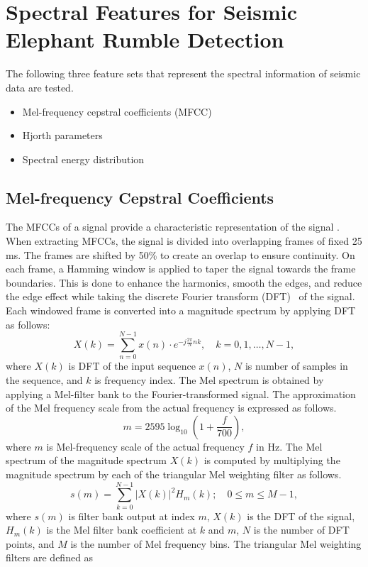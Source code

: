 \documentclass[applsci,article,accept,moreauthors,pdftex]{Definitions/mdpi}
\begin{document}
\section {Spectral Features for Seismic Elephant Rumble Detection}
The following three feature sets that represent the spectral information of seismic data are tested.
\begin{itemize}
	\item Mel-frequency cepstral coefficients (MFCC)
	\item Hjorth parameters
	\item Spectral energy distribution
\end{itemize}
\subsection{Mel-frequency Cepstral Coefficients}
The MFCCs of a signal provide a characteristic representation of the signal \cite{jurafsky}. When extracting MFCCs, the signal is divided into overlapping frames of fixed 25 ms. The frames are shifted by 50\% to create an overlap to ensure continuity. On each frame, a  Hamming window is applied to taper the signal towards the frame boundaries. This is done to enhance the harmonics, smooth the edges, and reduce the edge effect while taking the discrete Fourier transform (DFT)~\cite{oppenheim1999discrete} of the signal. Each windowed frame is converted into a magnitude spectrum by applying DFT as follows:
\begin{equation}
	X(k) = \sum_{n=0}^{N-1} x(n) \cdot e^{-j\frac{2\pi}{N}nk}, \quad k = 0, 1, \ldots, N-1,
\end{equation}
where $X(k)$ is DFT of the input sequence $x(n)$, $N$ is number of samples in the sequence, and $k$ is frequency index.
The Mel spectrum is obtained by applying a Mel-filter bank to the Fourier-transformed signal. The approximation of the Mel frequency scale from the actual frequency is expressed as follows.
\begin{equation}
	m = 2595 \log_{10}\left(1 + \frac{f}{700}\right),
\end{equation}
where $m$ is Mel-frequency scale of the actual frequency $f$ in Hz. The Mel spectrum of the magnitude spectrum $X(k)$ is computed by multiplying the magnitude spectrum by each of the  triangular Mel weighting filter as follows.
\begin{equation}
	s(m) = \sum_{k=0}^{N-1} |X(k)|^2 H_m(k) ; \quad 0 \leq m \leq M - 1,
\end{equation}
where $s(m)$ is filter bank output at index $m$, $X(k)$ is the DFT of the signal, $H_m(k)$ is the Mel filter bank coefficient at $k$ and $m$, $N$ is the number of DFT points, and $M$ is the number of Mel frequency bins. The triangular Mel weighting filters are defined as
\end{document}
